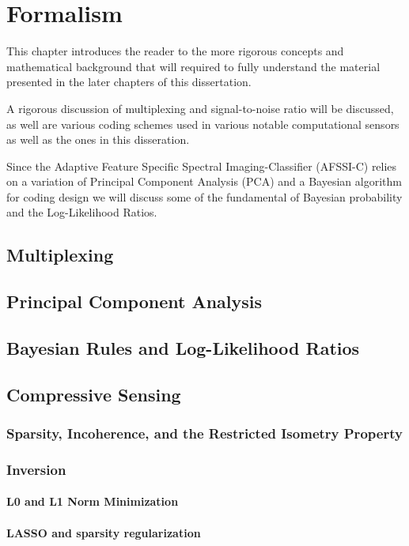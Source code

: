 \chapter{Formalism}\label{chap:Formalism}

This chapter introduces the reader to the more rigorous concepts and mathematical background that will required to fully understand the material presented in the later chapters of this dissertation. 

A rigorous discussion of multiplexing and signal-to-noise ratio will be discussed, as well are various coding schemes used in various notable computational sensors as well as the ones in this disseration. 

Since the Adaptive Feature Specific Spectral Imaging-Classifier (AFSSI-C) relies on a variation of Principal Component Analysis (PCA) and a Bayesian algorithm for coding design we will discuss some of the fundamental of Bayesian probability and the Log-Likelihood Ratios. 

\section{Multiplexing}

\section{Principal Component Analysis}

\section{Bayesian Rules and Log-Likelihood Ratios}

\section{Compressive Sensing}

\subsection{Sparsity, Incoherence, and the Restricted Isometry Property}

\subsection{Inversion}

\subsubsection{L0 and L1 Norm Minimization}

\subsubsection{LASSO and sparsity regularization}

%  
%



